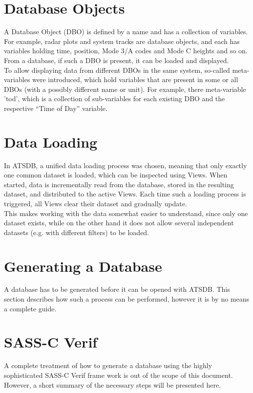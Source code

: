 \section*{Database Objects}
A Database Object (DBO) is defined by a name and has a collection of variables. For example, radar plots and system tracks are database objects, and each has variables holding time, position, Mode 3/A codes and Mode C heights and so on. From a database, if such a DBO is present, it can be loaded and displayed.\\

To allow displaying data from different DBOs in the same system, so-called meta-variables were  introduced, which hold variables that are present in some or all DBOs (with a possibly different name or unit).  For example, there meta-variable 'tod', which is a collection of sub-variables for each existing DBO and the respective ``Time of Day'' variable.

\section*{Data Loading}
In ATSDB, a unified data loading process was chosen, meaning that only exactly one common dataset is loaded, which can be inspected using Views. When started, data is incrementally read from the database, stored in the resulting dataset, and distributed to the active Views. Each time such a loading process is triggered, all Views clear their dataset and gradually update. \\
This makes working with the data somewhat easier to understand, since only one dataset exists, while on the other hand it does not allow several independent datasets (e.g. with different filters) to be loaded.

\section*{Generating a Database}
\label{sec:generation}

A database has to be generated before it can be opened with ATSDB.  This section describes how such
a process can be performed, however it is by no means a complete guide.

\section*{SASS-C Verif}
A complete treatment of how to generate a database using the highly sophisticated SASS-C Verif frame work  is  out  of  the  scope  of  this  document.   However,  a  short  summary  of  the  necessary  steps  will  be presented here.\\

